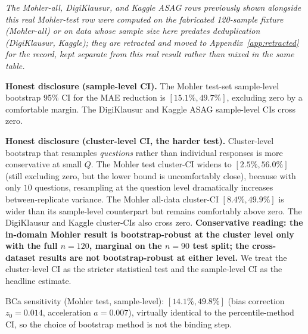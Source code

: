 \documentclass[conference]{IEEEtran}
\begin{document}
\textit{The Mohler-all, DigiKlausur, and Kaggle ASAG rows previously
shown alongside this real Mohler-test row were computed on the
fabricated 120-sample fixture (Mohler-all) or on data whose sample size
here predates deduplication (DigiKlausur, Kaggle); they are retracted
and moved to Appendix~\ref{app:retracted} for the record, kept separate
from this real result rather than mixed in the same table.}

\textbf{Honest disclosure (sample-level CI).} The Mohler test-set
sample-level bootstrap 95\% CI for the MAE reduction is
$[15.1\%, 49.7\%]$, excluding zero by a comfortable margin. The
DigiKlausur and Kaggle ASAG sample-level CIs cross zero.

\textbf{Honest disclosure (cluster-level CI, the harder test).}
Cluster-level bootstrap that resamples \emph{questions} rather than
individual responses is more conservative at small $Q$. The Mohler
test cluster-CI widens to $[2.5\%, 56.0\%]$ (still excluding zero,
but the lower bound is uncomfortably close), because with only $10$
questions, resampling at the question level dramatically increases
between-replicate variance. The Mohler all-data cluster-CI
$[8.4\%, 49.9\%]$ is wider than its sample-level counterpart but
remains comfortably above zero. The DigiKlausur and Kaggle cluster-CIs
also cross zero. \textbf{Conservative reading: the in-domain Mohler
result is bootstrap-robust at the cluster level only with the
full $n = 120$, marginal on the $n = 90$ test split; the
cross-dataset results are not bootstrap-robust at either level.}
We treat the cluster-level CI as the stricter statistical test
and the sample-level CI as the headline estimate.

BCa sensitivity (Mohler test, sample-level): $[14.1\%, 49.8\%]$
(bias correction $z_0 = 0.014$, acceleration $a = 0.007$), virtually
identical to the percentile-method CI, so the choice of bootstrap
method is not the binding step.
\end{document}
